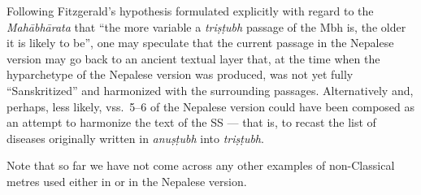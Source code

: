Following Fitzgerald's hypothesis \parencite[99]{fitz-2009} formulated explicitly 
with regard to the \textit{Mahābhārata} that ``the more variable a 
\textit{triṣṭubh} passage of the Mbh is, the older it is likely to be'', one may 
speculate that the current passage in the Nepalese version may go back to an 
ancient textual layer that, at the time when the hyparchetype of the Nepalese 
version was produced, was not yet fully ``Sanskritized'' and harmonized with the 
surrounding passages. 
Alternatively and, perhaps, less likely, vss.\ 5--6 of the Nepalese version could 
have been composed as an attempt to harmonize the text of the SS --- that is, to 
recast the list of diseases originally written in \textit{anuṣṭubh} into 
\textit{triṣṭubh}. %

Note that so far we have not come across any other examples of non-Classical 
metres used either in \cite{vulgate} or in the Nepalese version. 

